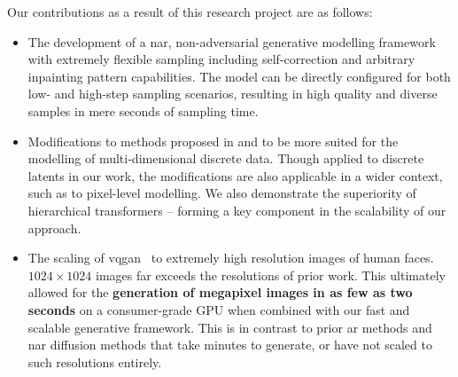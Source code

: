 Our contributions as a result of this research project are as follows:
\begin{itemize}
    \item
        The development of a \acrlong{nar}, non-adversarial generative modelling
        framework with extremely flexible sampling including self-correction and
        arbitrary inpainting pattern capabilities. The model can be directly
        configured for both low- and high-step sampling scenarios, resulting in
        high quality and diverse samples in mere seconds of sampling time.

    \item
        Modifications to methods proposed in \citet{savinov2022stepunrolled} and
        \citet{nawrot2021hierarchical} to be more suited for the modelling of
        multi-dimensional discrete data. Though applied to discrete latents in
        our work, the modifications are also applicable in a wider context,
        such as to pixel-level modelling. We also demonstrate the superiority of
        hierarchical transformers -- forming a key component in the scalability
        of our approach. 

    \item
        The scaling of \gls{vqgan}~\cite{esser2021taming} to extremely high
        resolution images of human faces. $1024 \times 1024$ images far exceeds
        the resolutions of prior work. This ultimately allowed for the
        \textbf{generation of megapixel images in as few as two seconds} on a
        consumer-grade GPU when combined with our fast and scalable generative
        framework. This is in contrast to prior \gls{ar} methods and \gls{nar}
        diffusion methods that take minutes to generate, or have not scaled to
        such resolutions entirely.

\end{itemize}
